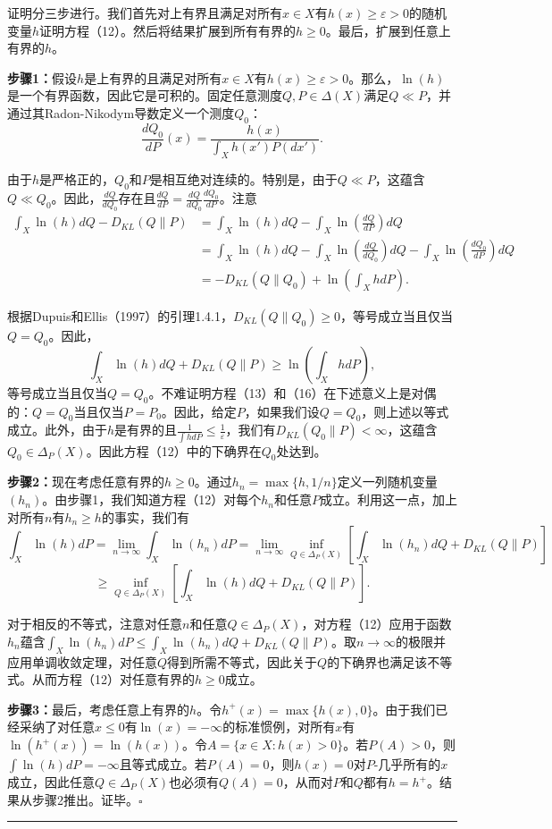\documentclass[12pt,a4paper]{article}
\newenvironment{translation}
  {\par\noindent\color{blue!70!black}\smallskip}
  {\par\medskip\hrule\medskip}
\begin{document}
\begin{translation}
证明分三步进行。我们首先对上有界且满足对所有$x \in X$有$h(x) \geq \varepsilon > 0$的随机变量$h$证明方程（12）。然后将结果扩展到所有有界的$h \geq 0$。最后，扩展到任意上有界的$h$。

\textbf{步骤1：}假设$h$是上有界的且满足对所有$x \in X$有$h(x) \geq \varepsilon > 0$。那么，$\ln(h)$是一个有界函数，因此它是可积的。固定任意测度$Q, P \in \Delta(X)$满足$Q \ll P$，并通过其Radon-Nikodym导数定义一个测度$Q_0$：
\[
\frac{dQ_0}{dP}(x) = \frac{h(x)}{\int_X h(x') P(dx')}.
\]

由于$h$是严格正的，$Q_0$和$P$是相互绝对连续的。特别是，由于$Q \ll P$，这蕴含$Q \ll Q_0$。因此，$\frac{dQ}{dQ_0}$存在且$\frac{dQ}{dP} = \frac{dQ}{dQ_0} \frac{dQ_0}{dP}$。注意
\begin{align*}
\int_X \ln(h) dQ - D_{KL}(Q\|P)
&= \int_X \ln(h) dQ - \int_X \ln\left( \frac{dQ}{dP} \right) dQ \\
&= \int_X \ln(h) dQ - \int_X \ln\left( \frac{dQ}{dQ_0} \right) dQ - \int_X \ln\left( \frac{dQ_0}{dP} \right) dQ \\
&= -D_{KL}(Q\|Q_0) + \ln\left( \int_X h dP \right).
\end{align*}

根据Dupuis和Ellis（1997）的引理1.4.1，$D_{KL}(Q\|Q_0) \geq 0$，等号成立当且仅当$Q = Q_0$。因此，
\[
\int_X \ln(h) dQ + D_{KL}(Q\|P) \geq \ln\left( \int_X h dP \right),
\]
等号成立当且仅当$Q = Q_0$。不难证明方程（13）和（16）在下述意义上是对偶的：$Q = Q_0$当且仅当$P = P_0$。因此，给定$P$，如果我们设$Q = Q_0$，则上述以等式成立。此外，由于$h$是有界的且$\frac{1}{\int h dP} \leq \frac{1}{\varepsilon}$，我们有$D_{KL}(Q_0\|P) < \infty$，这蕴含$Q_0 \in \Delta_P(X)$。因此方程（12）中的下确界在$Q_0$处达到。

\textbf{步骤2：}现在考虑任意有界的$h \geq 0$。通过$h_n = \max\{h, 1/n\}$定义一列随机变量$(h_n)$。由步骤1，我们知道方程（12）对每个$h_n$和任意$P$成立。利用这一点，加上对所有$n$有$h_n \geq h$的事实，我们有
\[
\int_X \ln(h) dP = \lim_{n \to \infty} \int_X \ln(h_n) dP = \lim_{n \to \infty} \inf_{Q \in \Delta_P(X)} \left[ \int_X \ln(h_n) dQ + D_{KL}(Q\|P) \right]
\]
\[
\geq \inf_{Q \in \Delta_P(X)} \left[ \int_X \ln(h) dQ + D_{KL}(Q\|P) \right].
\]

对于相反的不等式，注意对任意$n$和任意$Q \in \Delta_P(X)$，对方程（12）应用于函数$h_n$蕴含$\int_X \ln(h_n) dP \leq \int_X \ln(h_n) dQ + D_{KL}(Q\|P)$。取$n \to \infty$的极限并应用单调收敛定理，对任意$Q$得到所需不等式，因此关于$Q$的下确界也满足该不等式。从而方程（12）对任意有界的$h \geq 0$成立。

\textbf{步骤3：}最后，考虑任意上有界的$h$。令$h^+(x) = \max\{h(x), 0\}$。由于我们已经采纳了对任意$x \leq 0$有$\ln(x) = -\infty$的标准惯例，对所有$x$有$\ln(h^+(x)) = \ln(h(x))$。令$A = \{ x \in X : h(x) > 0 \}$。若$P(A) > 0$，则$\int \ln(h) dP = -\infty$且等式成立。若$P(A) = 0$，则$h(x) = 0$对$P$-几乎所有的$x$成立，因此任意$Q \in \Delta_P(X)$也必须有$Q(A) = 0$，从而对$P$和$Q$都有$h = h^+$。结果从步骤2推出。证毕。$\square$
\end{translation}
\end{document}

